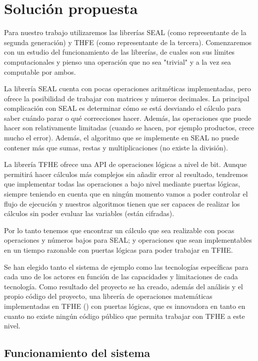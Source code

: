 \chapter{Solución propuesta}
\label{chap:poc}

Para nuestro trabajo utilizaremos las librerías SEAL (como representante de la segunda generación) y THFE (como representante de la tercera). Comenzaremos con un estudio del funcionamiento de las librerías, de cuales son sus límites computacionales y pienso una operación que no sea "trivial" y a la vez sea computable por ambos.

La librería SEAL cuenta con pocas operaciones aritméticas implementadas, pero ofrece la posibilidad de trabajar con matrices y números decimales. La principal complicación con SEAL es determinar cómo se está desviando el cálculo para saber cuándo parar o qué correcciones hacer. Además, las operaciones que puede hacer son relativamente limitadas (cuando se hacen, por ejemplo productos, crece mucho el error). Además, el algoritmo que se implemente en SEAL no puede contener más que sumas, restas y multiplicaciones (no existe la división).

La librería TFHE ofrece una API de operaciones lógicas a nivel de bit. Aunque permitirá hacer cálculos más complejos sin añadir error al resultado, tendremos que implementar todas las operaciones a bajo nivel mediante puertas lógicas, siempre teniendo en cuenta que en ningún momento vamos a poder controlar el flujo de ejecución y nuestros algoritmos tienen que ser capaces de realizar los cálculos sin poder evaluar las variables (están cifradas).

Por lo tanto tenemos que encontrar un cálculo que sea realizable con pocas operaciones y números bajos para SEAL; y operaciones que sean implementables en un tiempo razonable con puertas lógicas para poder trabajar en TFHE.

Se han elegido tanto el sistema de ejemplo como las tecnologías específicas para cada uno de los actores en función de las capacidades y limitaciones de cada tecnología. Como resultado del proyecto se ha creado, además del análisis y el propio código del proyecto, una librería de operaciones matemáticas implementadas en TFHE (\cite{junquera_tfhe_2019}) con puertas lógicas, que es innovadora en tanto en cuanto no existe ningún código público que permita trabajar con TFHE a este nivel.

\section{Funcionamiento del sistema}

